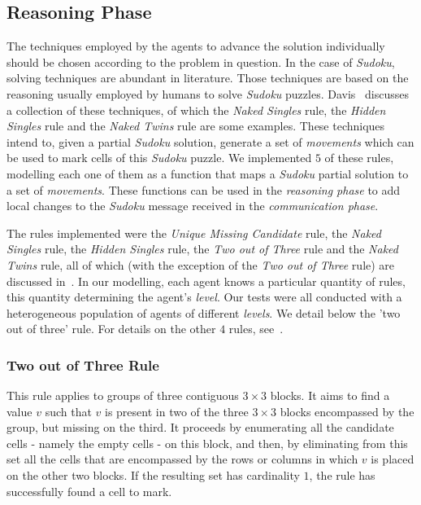 \documentclass{article}
\begin{document}
\subsection{Reasoning Phase}

The techniques employed by the agents to advance the solution individually should be chosen according to the problem in question. In the case of {\em Sudoku}, solving techniques are abundant in literature. %
Those techniques are based on the reasoning usually employed by humans to solve \emph{Sudoku} puzzles. Davis~\cite{davis:mathsudoku} discusses a collection of these techniques, of which the {\em Naked Singles} rule, the {\em Hidden Singles} rule and the {\em Naked Twins} rule are some examples. These techniques intend to, given a partial {\em Sudoku} solution, generate a set of {\em movements} which can be used to mark cells of this {\em Sudoku} puzzle. We implemented $5$ of these rules, modelling each one of them as a function that maps a {\em Sudoku} partial solution to a set of {\em movements}. These functions can be used in the {\em reasoning phase} to add local changes to the {\em Sudoku} message received in the {\em communication phase}.

The rules implemented were the {\em Unique Missing Candidate} rule, the {\em Naked Singles} rule, the {\em Hidden Singles} rule, the {\em Two out of Three} rule and the {\em Naked Twins} rule, all of which (with the exception of the {\em Two out of Three} rule) are discussed in~\cite{davis:mathsudoku}. In our modelling, each agent knows a particular quantity of rules, this quantity determining the agent's {\em level}. Our tests were all conducted with a heterogeneous population of agents of different {\em levels}. We detail below the 'two out of three' rule. For details on the other $4$ rules, see~\cite{davis:mathsudoku}.

\subsubsection{Two out of Three Rule}

This rule applies to groups of three contiguous $3 \times 3$ blocks. It aims to find a value $v$ such that $v$ is present in two of the three $3 \times 3$ blocks encompassed by the group, but missing on the third. It proceeds by enumerating all the candidate cells - namely the empty cells - on this block, and then, by eliminating from this set all the cells that are encompassed by the rows or columns in which $v$ is placed on the other two blocks. If the resulting set has cardinality $1$, the rule has successfully found a cell to mark.
\end{document}
